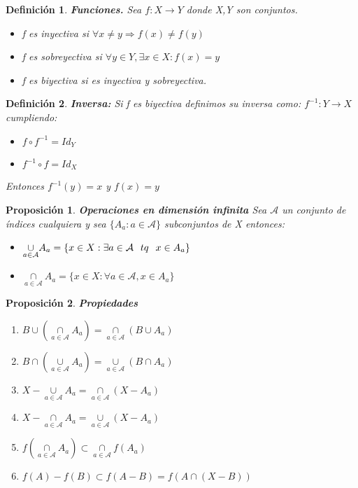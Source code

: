 \documentclass[10pt, a4paper]{article}
\newenvironment{nlist}
{\begin{enumerate}
    \renewcommand\labelenumi{(\emph{\roman{enumi})}}}
  {\end{enumerate}}
\theoremstyle{theorem-style}
\newtheorem{nprop}{Proposición}[section]
\theoremstyle{definition-style}
\newtheorem{ndef}{Definición}[section]
\theoremstyle{remark-style}
\theoremstyle{example-style}
\theoremstyle{definition-style}
\theoremstyle{remark-style}
\begin{document}
\begin{ndef}\textbf{Funciones.}
Sea $f:X\rightarrow Y$ donde X,Y son conjuntos.
\begin{itemize}
\item f es inyectiva si $\forall x\neq y \Rightarrow f(x)\neq f(y)$
\item f es sobreyectiva si $\forall y\in Y, \exists x\in X : f(x)=y$
\item f es biyectiva si es inyectiva y sobreyectiva.
\end{itemize}
\end{ndef}

\begin{ndef}\textbf{Inversa:}
Si f es biyectiva definimos su inversa como: $f^{-1}:Y\rightarrow X$ cumpliendo:
\begin{itemize}
\item $f\circ f^{-1}=Id_Y$
\item $f^{-1}\circ f = Id_X$
\end{itemize}
Entonces $f^{-1}(y)=x$ y $f(x)=y$
\end{ndef}

\begin{nprop}\textbf{Operaciones en dimensión infinita}
Sea $\mathcal{A}$ un conjunto de índices cualquiera y sea $\{A_a : a\in\mathcal{A}\}$ subconjuntos de X entonces:
\begin{itemize}
\item $\underset{a\in\mathcal{A}}{\cup}A_a = \{x\in X : \exists a\in\mathcal{A}\hspace{0.25cm} tq\hspace{0.25cm}x\in A_a \}$
\item $\underset{a\in\mathcal{A}}{\cap}A_a = \{x\in X : \forall a\in\mathcal{A}, x\in A_a \}$
\end{itemize}
\end{nprop}

\begin{nprop}\textbf{Propiedades}
\begin{nlist}
\item $B\cup\left(\underset{a\in\mathcal{A}}{\cap}A_a\right)=\underset{a\in\mathcal{A}}{\cap}\left(B\cup A_a\right)$
\item $B\cap\left(\underset{a\in\mathcal{A}}{\cup}A_a\right)=\underset{a\in\mathcal{A}}{\cup}\left(B\cap A_a\right)$
\item $X-\underset{a\in\mathcal{A}}{\cup}A_a=\underset{a\in\mathcal{A}}{\cap}(X-A_a)$
\item$X-\underset{a\in\mathcal{A}}{\cap}A_a=\underset{a\in\mathcal{A}}{\cup}(X-A_a)$
\item $f\left(\underset{a\in\mathcal{A}}{\cap}A_a\right)\subset\underset{a\in\mathcal{A}}{\cap}f(A_a)$
\item $f(A)-f(B)\subset f(A-B)=f(A\cap (X-B))$
\end{nlist}
\end{nprop}
\end{document}
